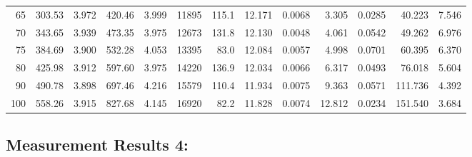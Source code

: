 \documentclass[10pt]{article}
\begin{document}
{\begin{tabular}{|r|rr|rr|rr|rr|rr|r|r|}
       65 &       303.53 &        3.972 &       420.46 &        3.999 &        11895 &        115.1 &       12.171 &       0.0068 &        3.305 &       0.0285 &       40.223 &        7.546 \\
       70 &       343.65 &        3.939 &       473.35 &        3.975 &        12673 &        131.8 &       12.130 &       0.0048 &        4.061 &       0.0542 &       49.262 &        6.976 \\
       75 &       384.69 &        3.900 &       532.28 &        4.053 &        13395 &         83.0 &       12.084 &       0.0057 &        4.998 &       0.0701 &       60.395 &        6.370 \\
       80 &       425.98 &        3.912 &       597.60 &        3.975 &        14220 &        136.9 &       12.034 &       0.0066 &        6.317 &       0.0493 &       76.018 &        5.604 \\
       90 &       490.78 &        3.898 &       697.46 &        4.216 &        15579 &        110.4 &       11.934 &       0.0075 &        9.363 &       0.0571 &      111.736 &        4.392 \\
      100 &       558.26 &        3.915 &       827.68 &        4.145 &        16920 &         82.2 &       11.828 &       0.0074 &       12.812 &       0.0234 &      151.540 &        3.684 \\
\hline
\end{tabular}
}



\subsection*{\large \bf Measurement Results 4:}
\end{document}
